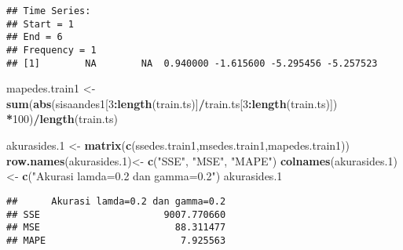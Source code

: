 \documentclass[
]{article}
\newenvironment{Shaded}{\begin{snugshade}}{\end{snugshade}}
\newcommand{\DecValTok}[1]{\textcolor[rgb]{0.00,0.00,0.81}{#1}}
\newcommand{\FloatTok}[1]{\textcolor[rgb]{0.00,0.00,0.81}{#1}}
\newcommand{\FunctionTok}[1]{\textcolor[rgb]{0.13,0.29,0.53}{\textbf{#1}}}
\newcommand{\NormalTok}[1]{#1}
\newcommand{\OtherTok}[1]{\textcolor[rgb]{0.56,0.35,0.01}{#1}}
\newcommand{\SpecialCharTok}[1]{\textcolor[rgb]{0.81,0.36,0.00}{\textbf{#1}}}
\newcommand{\StringTok}[1]{\textcolor[rgb]{0.31,0.60,0.02}{#1}}
\begin{document}
\begin{verbatim}
## Time Series:
## Start = 1 
## End = 6 
## Frequency = 1 
## [1]        NA        NA  0.940000 -1.615600 -5.295456 -5.257523
\end{verbatim}

\begin{Shaded}
\begin{Highlighting}[]
\NormalTok{mapedes.train1 }\OtherTok{\textless{}{-}} \FunctionTok{sum}\NormalTok{(}\FunctionTok{abs}\NormalTok{(sisaandes1[}\DecValTok{3}\SpecialCharTok{:}\FunctionTok{length}\NormalTok{(train.ts)]}\SpecialCharTok{/}\NormalTok{train.ts[}\DecValTok{3}\SpecialCharTok{:}\FunctionTok{length}\NormalTok{(train.ts)])}
                      \SpecialCharTok{*}\DecValTok{100}\NormalTok{)}\SpecialCharTok{/}\FunctionTok{length}\NormalTok{(train.ts)}

\NormalTok{akurasides}\FloatTok{.1} \OtherTok{\textless{}{-}} \FunctionTok{matrix}\NormalTok{(}\FunctionTok{c}\NormalTok{(ssedes.train1,msedes.train1,mapedes.train1))}
\FunctionTok{row.names}\NormalTok{(akurasides}\FloatTok{.1}\NormalTok{)}\OtherTok{\textless{}{-}} \FunctionTok{c}\NormalTok{(}\StringTok{"SSE"}\NormalTok{, }\StringTok{"MSE"}\NormalTok{, }\StringTok{"MAPE"}\NormalTok{)}
\FunctionTok{colnames}\NormalTok{(akurasides}\FloatTok{.1}\NormalTok{) }\OtherTok{\textless{}{-}} \FunctionTok{c}\NormalTok{(}\StringTok{"Akurasi lamda=0.2 dan gamma=0.2"}\NormalTok{)}
\NormalTok{akurasides}\FloatTok{.1}
\end{Highlighting}
\end{Shaded}

\begin{verbatim}
##      Akurasi lamda=0.2 dan gamma=0.2
## SSE                      9007.770660
## MSE                        88.311477
## MAPE                        7.925563
\end{verbatim}

\begin{Shaded}
\end{Shaded}
\end{document}
